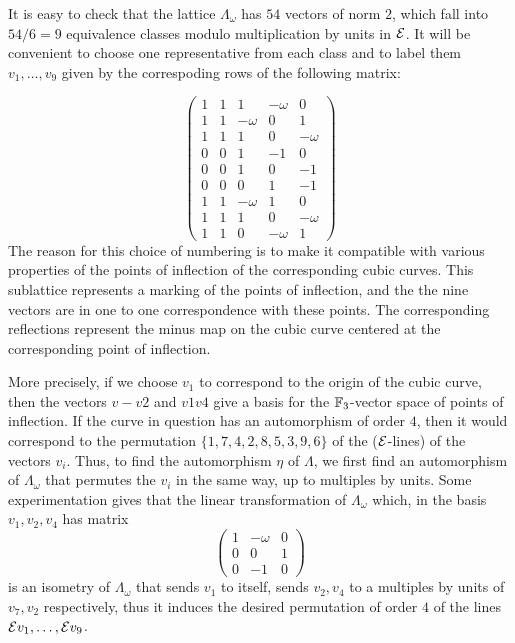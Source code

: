 \documentclass[11pt]{amsart}
\begin{document}
It is easy to check that the lattice $\Lambda_\omega$ has $54$ vectors of norm $2$, which fall into $54/6 = 9$ equivalence classes modulo multiplication by units in ${\mathcal E}$.  It will be convenient to choose one representative from each class and to label them $v_1,\dots ,v_9$ given by the correspoding rows of the following matrix:

\begin{equation}
\label{eq-roots}
\left(\begin{array}{ccccc}1 & 1 & 1 & -\omega & 0 \\1 & 1 & -\omega & 0 & 1 \\1 & 1 & 1 & 0 & -\omega \\0 & 0 & 1 & -1 & 0 \\0 & 0 & 1 & 0 & -1 \\0 & 0 & 0 & 1 & -1 \\1 & 1 & -\omega & 1 & 0 \\1 & 1 & 1 & 0 & -\omega \\1 & 1 & 0 & -\omega & 1\end{array}\right)
\end{equation}
The reason for this choice of numbering is to make it compatible with various properties of the points of inflection of the corresponding cubic curves.  This sublattice represents a marking of the points of inflection, and the the nine vectors are in one to one correspondence with these points.  The corresponding reflections represent the minus map on the cubic curve centered at the corresponding point of inflection.

More precisely, if we choose $v_1$ to correspond to the origin of the cubic curve, then the vectors $v-v2$ and $v1v4$ give a basis for the ${\mathbb F}_3$-vector space of points of inflection.   If the curve in question has an automorphism of order $4$, then it would correspond to the permutation $\{1,7,4,2,8,5,3,9,6\}$ of the (${\mathcal E}$-lines) of the vectors $v_i$.  Thus, to find the automorphism $\eta$ of $\Lambda$, we first find an automorphism of $\Lambda_\omega$ that permutes the $v_i$ in the same way, up to multiples by units.   Some experimentation gives that the linear transformation of $\Lambda_\omega$ which, in the basis $v_1,v_2,v_4$ has matrix 
\begin{equation}
\label{eq-orderfour}
\left(\begin{array}{ccc}1 & -\omega & 0 \\0 & 0 & 1 \\0 & -1 & 0\end{array}\right)
\end{equation}
is an isometry of $\Lambda_\omega$ that sends $v_1$ to itself, sends $v_2, v_4$ to a multiples by units  of $v_7, v_2$ respectively, thus it induces the desired permutation of order $4$ of the lines ${\mathcal E} v_1,\dots,{\mathcal E} v_9$.
\end{document}
